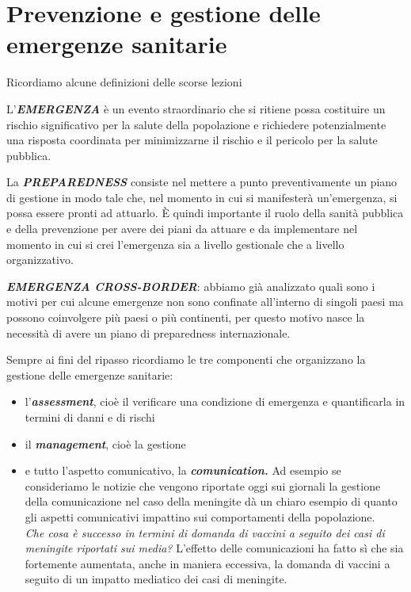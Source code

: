 \section{Prevenzione e gestione delle emergenze sanitarie}

Ricordiamo alcune definizioni delle scorse lezioni

L'\textbf{\emph{EMERGENZA}} è un evento straordinario che si ritiene
possa costituire un rischio significativo per la salute della
popolazione e richiedere potenzialmente una risposta coordinata per
minimizzarne il rischio e il pericolo per la salute pubblica.

La \textbf{\emph{PREPAREDNESS}} consiste nel mettere a punto
preventivamente un piano di gestione in modo tale che, nel momento in
cui si manifesterà un'emergenza, si possa essere pronti ad attuarlo. È
quindi importante il ruolo della sanità pubblica e della prevenzione per
avere dei piani da attuare e da implementare nel momento in cui si crei
l'emergenza sia a livello gestionale che a livello organizzativo.

\textbf{\emph{EMERGENZA CROSS-BORDER}}: abbiamo già analizzato quali
sono i motivi per cui alcune emergenze non sono confinate all'interno di
singoli paesi ma possono coinvolgere più paesi o più continenti, per
questo motivo nasce la necessità di avere un piano di preparedness
internazionale.

Sempre ai fini del ripasso ricordiamo le tre componenti che organizzano
la gestione delle emergenze sanitarie:

\begin{itemize}
\item
  l'\textbf{\emph{assessment}}, cioè il verificare una condizione di
  emergenza e quantificarla in termini di danni e di rischi

\item
  il \textbf{\emph{management}}, cioè la gestione
\item
  e tutto l'aspetto comunicativo, la \textbf{\emph{comunication.}} Ad
  esempio se consideriamo le notizie che vengono riportate oggi sui
  giornali la gestione della comunicazione nel caso della meningite dà
  un chiaro esempio di quanto gli aspetti comunicativi impattino sui
  comportamenti della popolazione.\\
  \emph{Che cosa è successo in termini di domanda di vaccini a seguito
  dei casi di meningite riportati sui media?} L'effetto delle
  comunicazioni ha fatto sì che sia fortemente aumentata, anche in
  maniera eccessiva, la domanda di vaccini a seguito di un impatto
  mediatico dei casi di meningite.
\end{itemize}

